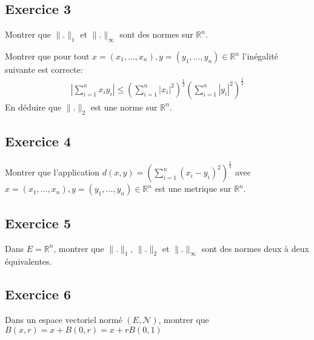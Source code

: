 \documentclass[letterpaper,10pt,french]{sphinxmanual}
\begin{document}
\subsection{Exercice 3}
\label{\detokenize{exo_metric:exercice-3}}
\sphinxhyphen{} Montrer que \(\|.\|_1\) et \(\|.\|_\infty\) sont des normes sur \(\mathbb R^n\).

\sphinxhyphen{} Montrer que pour tout \(x=(x_1, \ldots, x_n), y=(y_1, \ldots, y_n) \in \mathbb R^n\) l’inégalité suivante est correcte:
\begin{equation*}
\begin{split}
\left | \sum_{i=1}^n x_iy_i \right| \leq \left(\sum_{i=1}^n |x_i|^2 \right)^{\frac{1}{2}}\left(\sum_{i=1}^n |y_i|^2\right)^{\frac{1}{2}}
\end{split}
\end{equation*}
\sphinxhyphen{} En déduire que \(\|.\|_2\) est une norme sur \(\mathbb R^n\).


\subsection{Exercice 4}
\label{\detokenize{exo_metric:exercice-4}}
\sphinxAtStartPar
Montrer que l’application \(d(x, y)= \left (\sum_{i=1}^n(x_i-y_i)^2 \right )^\frac{1}{2}\) avec \(x=(x_1, \ldots, x_n), y=(y_1, \ldots, y_n) \in \mathbb R^n\) est une metrique sur \(\mathbb R^n\).


\subsection{Exercice 5}
\label{\detokenize{exo_metric:exercice-5}}
\sphinxAtStartPar
Dans \(E = \mathbb R^n\), montrer que \(\|.\|_1\), \(\|.\|_2\) et \(\|.\|_\infty\) sont des normes deux à deux équivalentes.


\subsection{Exercice 6}
\label{\detokenize{exo_metric:exercice-6}}
\sphinxAtStartPar
Dans un espace vectoriel normé \((E, \mathcal N)\), montrer que \(B(x, r) = x + B(0, r) = x + rB(0, 1)\)
\end{document}
